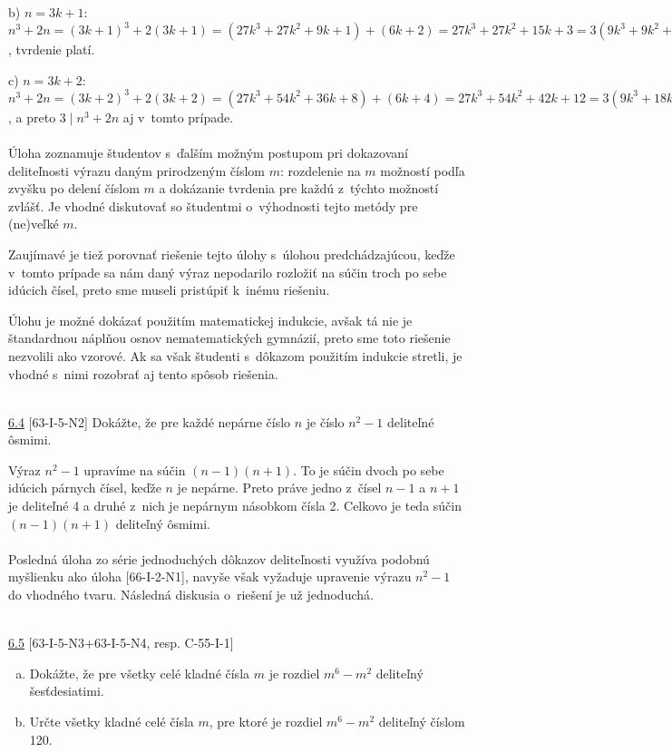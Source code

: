 b) $n=3k+1$: $n^3+2n=(3k+1)^3+2(3k+1)=(27k^3+27k^2+9k+1)+(6k+2)=27k^3+27k^2+15k+3=3(9k^3+9k^2+5k+1)$, tvrdenie platí.

c) $n=3k+2$: $n^3+2n=(3k+2)^3+2(3k+2)=(27k^3+54k^2+36k+8)+(6k+4)=27k^3+54k^2+42k+12=3(9k^3+18k^2+14k+4)$, a preto $3\mid n^3+2n$ aj v~tomto prípade.\\
\\
\kom Úloha zoznamuje študentov s~ďalším možným postupom pri dokazovaní deliteľnosti výrazu daným prirodzeným číslom $m$: rozdelenie na $m$ možností podľa zvyšku po delení číslom $m$ a dokázanie tvrdenia pre každú z~týchto možností zvlášť. Je vhodné diskutovať so študentmi o~výhodnosti tejto metódy pre (ne)veľké $m$.

Zaujímavé je tiež porovnať riešenie tejto úlohy s~úlohou predchádzajúcou, keďže v~tomto prípade sa nám daný výraz nepodarilo rozložiť na súčin troch po sebe idúcich čísel, preto sme museli pristúpiť k~inému riešeniu.

Úlohu je možné dokázať použitím matematickej indukcie, avšak tá nie je štandardnou náplňou osnov nematematických gymnázií, preto sme toto riešenie nezvolili ako vzorové. Ak sa však študenti s~dôkazom použitím indukcie stretli, je vhodné s~nimi rozobrať aj tento spôsob riešenia.\\
\\
\begin{tcolorbox}[breakable,notitle,boxrule=0pt,colback=light-gray,colframe=light-gray]\ul{6.4} [63-I-5-N2] Dokážte, že pre každé nepárne číslo $n$ je číslo $n^2 - 1$ deliteľné ôsmimi.

\end{tcolorbox}

\rie Výraz $n^2-1$ upravíme na súčin $(n-1)(n+1)$. To je súčin dvoch po sebe idúcich párnych čísel, keďže $n$ je nepárne. Preto práve jedno z~čísel $n-1$ a $n+1$ je deliteľné 4 a druhé z~nich je nepárnym násobkom čísla 2. Celkovo je teda súčin $(n-1)(n+1)$ deliteľný ôsmimi.\\
\\
\kom Posledná úloha zo série jednoduchých dôkazov deliteľnosti využíva podobnú myšlienku ako úloha [66-I-2-N1], navyše však vyžaduje upravenie výrazu $n^2-1$ do vhodného tvaru. Následná diskusia o~riešení je už jednoduchá.\\
\\
\begin{tcolorbox}[breakable,notitle,boxrule=0pt,colback=light-gray,colframe=light-gray]\ul{6.5} [63-I-5-N3+63-I-5-N4, resp. C-55-I-1] \begin{enumerate}[a)]
\item Dokážte, že pre všetky celé kladné čísla $m$ je rozdiel $m^6 - m^2$ deliteľný šesťdesiatimi.
\item Určte všetky kladné celé čísla $m$, pre ktoré je rozdiel $m^6 - m^2$ deliteľný číslom 120.
\end{enumerate}
\end{tcolorbox}

